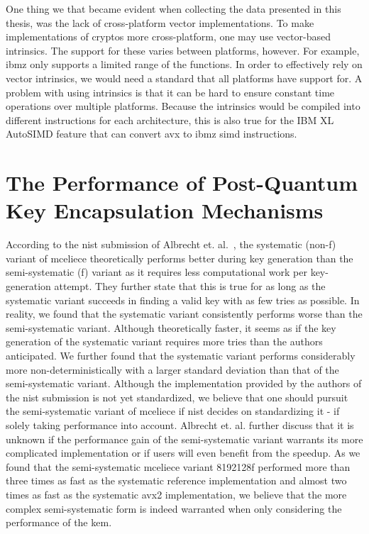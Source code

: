 One thing we that became evident when collecting the data presented in this thesis, was the lack of cross-platform vector implementations. To make implementations of cryptos more cross-platform, one may use vector-based intrinsics. The support for these varies between platforms, however. For example, \gls{ibmz} only supports a limited range of the functions. In order to effectively rely on vector intrinsics, we would need a standard that all platforms have support for. A problem with using intrinsics is that it can be hard to ensure constant time operations over multiple platforms. Because the intrinsics would be compiled into different instructions for each architecture, this is also true for the IBM XL AutoSIMD feature that can convert \gls{avx} to \gls{ibmz} \gls{simd} instructions.

\section{The Performance of Post-Quantum Key Encapsulation Mechanisms}
\label{section:discussion:post-quantum-performance}

According to the \gls{nist} submission of Albrecht et. al.~\cite{mceliece2020}, the systematic (non-f) variant of \gls{mceliece} theoretically performs better during key generation than the semi-systematic (f) variant as it requires less computational work per key-generation attempt. They further state that this is true for as long as the systematic variant succeeds in finding a valid key with as few tries as possible. In reality, we found that the systematic variant consistently performs worse than the semi-systematic variant. Although theoretically faster, it seems as if the key generation of the systematic variant requires more tries than the authors anticipated. We further found that the systematic variant performs considerably more non-deterministically with a larger standard deviation than that of the semi-systematic variant. Although the implementation provided by the authors of the \gls{nist} submission is not yet standardized, we believe that one should pursuit the semi-systematic variant of \gls{mceliece} if \gls{nist} decides on standardizing it - if solely taking performance into account. Albrecht et. al. further discuss that it is unknown if the performance gain of the semi-systematic variant warrants its more complicated implementation or if users will even benefit from the speedup. As we found that the semi-systematic \gls{mceliece} variant 8192128f performed more than three times as fast as the systematic reference implementation and almost two times as fast as the systematic \gls{avx2} implementation, we believe that the more complex semi-systematic form is indeed warranted when only considering the performance of the \gls{kem}.

